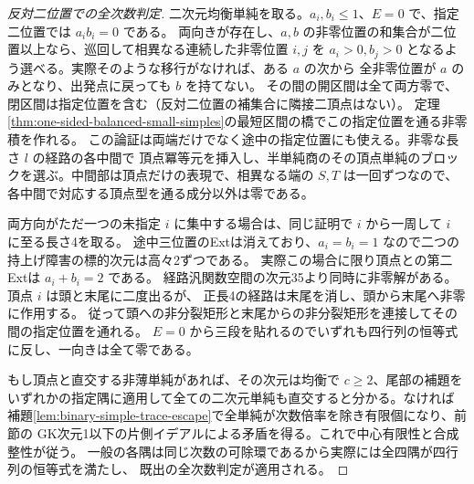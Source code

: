 \begin{proof}[反対二位置での全次数判定]
二次元均衡単純を取る。$a_i,b_i\le1$、$E=0$ で、指定二位置では $a_i b_i=0$ である。
両向きが存在し、$a,b$ の非零位置の和集合が二位置以上なら、巡回して相異なる連続した非零位置
$i,j$ を $a_i>0,b_j>0$ となるよう選べる。実際そのような移行がなければ、ある $a$ の次から
全非零位置が $a$ のみとなり、出発点に戻っても $b$ を持てない。
その間の開区間は全て両方零で、閉区間は指定位置を含む（反対二位置の補集合に隣接二頂点はない）。
定理\ref{thm:one-sided-balanced-small-simples}の最短区間の橋でこの指定位置を通る非零積を作れる。
この論証は両端だけでなく途中の指定位置にも使える。非零な長さ $l$ の経路の各中間で
頂点冪等元を挿入し、半単純商のその頂点単純のブロックを選ぶ。中間部は頂点だけの表現で、相異なる端の
$S,T$ は一回ずつなので、各中間で対応する頂点型を通る成分以外は零である。

両方向がただ一つの未指定 $i$ に集中する場合は、同じ証明で $i$ から一周して $i$ に至る長さ4を取る。
途中三位置のExtは消えており、$a_i=b_i=1$ なので二つの持上げ障害の標的次元は高々2ずつである。
実際この場合に限り頂点との第二Extは $a_i+b_i=2$ である。
経路汎関数空間の次元35より同時に非零解がある。頂点 $i$ は頭と末尾に二度出るが、
正長4の経路は末尾を消し、頭から末尾へ非零に作用する。
従って頭への非分裂矩形と末尾からの非分裂矩形を連接してその間の指定位置を通れる。
$E=0$ から三段を貼れるのでいずれも四行列の恒等式に反し、一向きは全て零である。

もし頂点と直交する非薄単純があれば、その次元は均衡で $c\ge2$、尾部の補題を
いずれかの指定隅に適用して全ての二次元単純も直交すると分かる。なければ
補題\ref{lem:binary-simple-trace-escape}で全単純が次数倍率を除き有限個になり、前節の
GK次元1以下の片側イデアルによる矛盾を得る。これで中心有限性と合成整性が従う。
一般の各隅は同じ次数の可除環であるから実際には全四隅が四行列の恒等式を満たし、
既出の全次数判定が適用される。
\end{proof}
